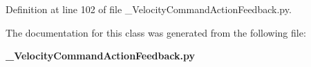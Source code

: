 \subsubsection[{status}]{}\label{classoryx__drive__controller_1_1msg_1_1__VelocityCommandActionFeedback_1_1VelocityCommandActionFeedback_a5ebdbe06bef3471e1f825766ee45a302}


\-Definition at line 102 of file \-\_\-\-Velocity\-Command\-Action\-Feedback.\-py.



\-The documentation for this class was generated from the following file\-:\begin{DoxyCompactItemize}
\item 
{\bf \-\_\-\-Velocity\-Command\-Action\-Feedback.\-py}\end{DoxyCompactItemize}
